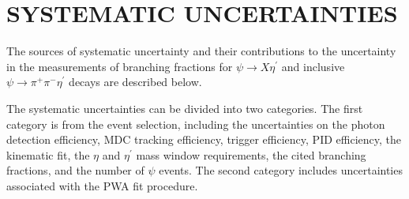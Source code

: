 \documentclass[twocolumn,showpacs,aps,prd]{revtex4-1}
\newcommand{\etap}{\eta^{\prime}}
\begin{document}
\section{\boldmath SYSTEMATIC UNCERTAINTIES}\label{Sys_err}
The sources of systematic uncertainty and their contributions to the uncertainty in the measurements of branching fractions for $\psi \to
X\eta^\prime$ and inclusive $\psi \to \pi^{+} \pi^{-} \etap$ decays are described below.

The systematic uncertainties can be divided into two categories. The first category is from the event selection,
including the uncertainties on the photon detection efficiency, MDC tracking efficiency, trigger efficiency, PID efficiency, the kinematic fit, the $\eta$ and $\etap$ mass window requirements, the cited branching
fractions, and the number of $\psi$ events. The second category includes uncertainties associated with the PWA fit procedure.
\end{document}
